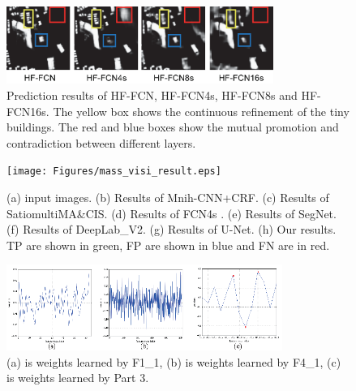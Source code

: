 \begin{figure}
\vspace{-0cm}
\setlength{\abovecaptionskip}{-0cm}  
\setlength{\belowcaptionskip}{-1.5cm}  
\centering
\includegraphics[width=8.7cm]{Figures/HF-FCN_variants_result.eps}
\caption{Prediction results of HF-FCN, HF-FCN4s, HF-FCN8s and HF-FCN16s. The yellow box shows the continuous refinement of the tiny buildings. The red and blue boxes show the mutual promotion and contradiction between different layers.}
\label{fig:Mass-variants-visi}
\end{figure}

\begin{figure}
\vspace{-0.5cm}
\setlength{\abovecaptionskip}{-0cm}
\setlength{\belowcaptionskip}{-1cm}  
\centering
\texttt{[image: Figures/mass\_visi\_result.eps]}
\caption{(a) input images. (b) Results of Mnih-CNN+CRF. (c) Results of Satio\-multi\-MA\&CIS. (d) Results of FCN4s . (e) Results of SegNet. (f) Results of DeepLab\_V2. (g) Results of U-Net. (h) Our results. TP are shown in green, FP are shown in blue and FN are in red.}
\label{fig:Mass-visi-result}
\end{figure}

\begin{figure}
\vspace{-0.2cm}
\setlength{\abovecaptionskip}{-0cm}
\setlength{\belowcaptionskip}{-1cm}  
\centering
\includegraphics[width=9cm]{Figures/weights.eps}
\caption{(a) is weights learned by F1\_1, (b) is weights learned by F4\_1, (c) is weights learned by Part 3.}
\label{fig:Mass-weights}
\end{figure}

